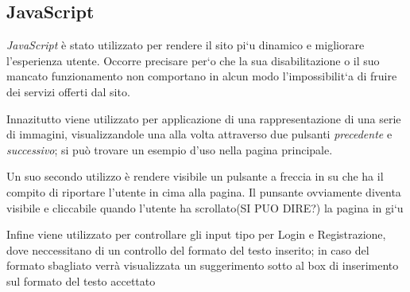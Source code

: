 \subsection{JavaScript}
\textit{JavaScript } è stato utilizzato per rendere il sito pi`u dinamico e migliorare l’esperienza utente. Occorre
precisare per`o che la sua disabilitazione o il suo mancato funzionamento non comportano in alcun
modo l’impossibilit`a di fruire dei servizi offerti dal sito.

Innazitutto viene utilizzato per applicazione di una rappresentazione di una serie di immagini, visualizzandole
una alla volta attraverso due pulsanti \textit{precedente} e \textit{successivo}; si può trovare un esempio d'uso
nella pagina principale.

Un suo secondo utilizzo è rendere visibile un pulsante a freccia in su che ha il compito di riportare l'utente
in cima alla pagina. Il punsante ovviamente diventa visibile e cliccabile quando l'utente ha scrollato(SI PUO DIRE?) la pagina in gi`u 

Infine viene utilizzato per controllare gli input tipo per Login e Registrazione, dove neccessitano di un controllo del formato
del testo inserito; in caso del formato sbagliato verrà visualizzata un suggerimento sotto al box di inserimento sul formato del
testo accettato